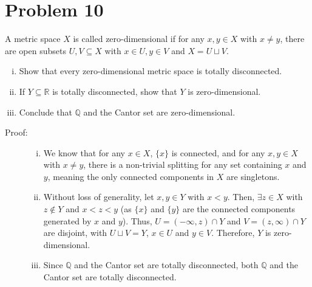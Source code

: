 \documentclass[10pt]{extarticle}
\newcommand{\Q}{\mathbb{Q}}
\newcommand{\R}{\mathbb{R}}
\begin{document}
  \section{Problem 10}%
  A metric space $X$ is called zero-dimensional if for any $x,y\in X$ with $x\neq y$, there are open subsets $U,V\subseteq X$ with $x\in U,y\in V$ and $X = U\sqcup V$.
  \begin{enumerate}[(i)]
    \item Show that every zero-dimensional metric space is totally disconnected.
    \item If $Y\subseteq \R$ is totally disconnected, show that $Y$ is zero-dimensional.
    \item Conclude that $\Q$ and the Cantor set are zero-dimensional.
  \end{enumerate}
  \begin{description}
    \item[Proof:]\hfill
      \begin{enumerate}[(i)]
        \item We know that for any $x\in X$, $\{x\}$ is connected, and for any $x,y\in X$ with $x\neq y$, there is a non-trivial splitting for any set containing $x$ and $y$, meaning the only connected components in $X$ are singletons.
        \item Without loss of generality, let $x,y\in Y$ with $x < y$. Then, $\exists z\in X$ with $z\notin Y$ and $x < z < y$ (as $\{x\}$ and $\{y\}$ are the connected components generated by $x$ and $y$). Thus, $U = (-\infty,z)\cap Y$ and $V = (z,\infty)\cap Y$ are disjoint, with $U\sqcup V = Y$, $x\in U$ and $y\in V$. Therefore, $Y$ is zero-dimensional.
        \item Since $\Q$ and the Cantor set are totally disconnected, both $\Q$ and the Cantor set are totally disconnected.
      \end{enumerate}
  \end{description}
\end{document}
